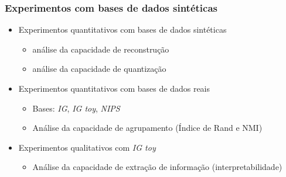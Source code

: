 \documentclass[10pt]{beamer}
\begin{document}


\begin{frame}
\frametitle{Experimentos com bases de dados sintéticas}
  \begin{itemize}
    \item Experimentos quantitativos com bases de dados sintéticas
    \begin{itemize}
      \item análise da capacidade de reconstrução
      \item análise da capacidade de quantização
    \end{itemize}
    \item Experimentos quantitativos com bases de dados reais
    \begin{itemize}
      \item Bases: \textit{IG}, \textit{IG toy}, \textit{NIPS}
      \item Análise da capacidade de agrupamento (Índice de Rand e NMI)
    \end{itemize}
    \item Experimentos qualitativos com \textit{IG toy}
    \begin{itemize}
      \item Análise da capacidade de extração de informação (interpretabilidade)
    \end{itemize}
  \end{itemize}
\end{frame}
\end{document}
